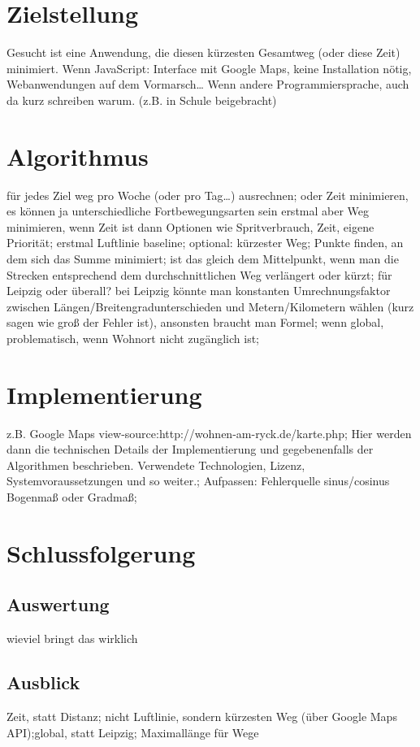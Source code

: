 \documentclass[a4paper, twoside, 12pt]{scrreprt}
\begin{document}
\chapter{Zielstellung}
Gesucht ist eine Anwendung, die diesen kürzesten Gesamtweg (oder diese Zeit) minimiert.
Wenn JavaScript: Interface mit Google Maps, keine Installation nötig, Webanwendungen auf dem Vormarsch…
Wenn andere Programmiersprache, auch da kurz schreiben warum. (z.B. in Schule beigebracht)
\chapter{Algorithmus}
für jedes Ziel weg pro Woche (oder pro Tag…) ausrechnen;
oder Zeit minimieren, es können ja unterschiedliche Fortbewegungsarten sein
erstmal aber Weg minimieren, wenn Zeit ist dann Optionen wie Spritverbrauch, Zeit, eigene Priorität;
erstmal Luftlinie baseline;
optional: kürzester Weg;
Punkte finden, an dem sich das Summe minimiert;
ist das gleich dem Mittelpunkt, wenn man die Strecken entsprechend dem durchschnittlichen Weg verlängert oder kürzt;
für Leipzig oder überall? bei Leipzig könnte man konstanten Umrechnungsfaktor zwischen Längen/Breitengradunterschieden und Metern/Kilometern wählen (kurz sagen wie groß der Fehler ist), ansonsten braucht man Formel;
wenn global, problematisch, wenn Wohnort nicht zugänglich ist;
\chapter{Implementierung}
z.B. Google Maps view-source:http://wohnen-am-ryck.de/karte.php;
Hier werden dann die technischen Details der Implementierung und gegebenenfalls der Algorithmen beschrieben. Verwendete Technologien, Lizenz, Systemvoraussetzungen und so weiter.;
Aufpassen: Fehlerquelle sinus/cosinus Bogenmaß oder Gradmaß;
\chapter{Schlussfolgerung}
\section{Auswertung}
wieviel bringt das wirklich
\section{Ausblick}
Zeit, statt Distanz; nicht Luftlinie, sondern kürzesten Weg (über Google Maps API);global, statt Leipzig; Maximallänge für Wege
{}

\end{document}
